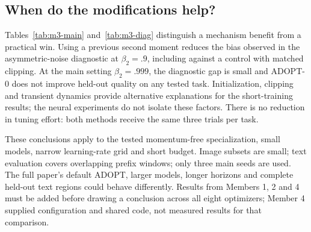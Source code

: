 \subsection{When do the modifications help?}
Tables~\ref{tab:m3-main} and~\ref{tab:m3-diag} distinguish a mechanism benefit from a
practical win. Using a previous second moment reduces the bias observed in the asymmetric-noise
diagnostic at $\beta_2=.9$, including against a control with matched clipping. At the main
setting $\beta_2=.999$, the diagnostic gap is small and ADOPT-0 does not improve held-out
quality on any tested task. Initialization, clipping and transient dynamics provide alternative
explanations for the short-training results; the neural experiments do not isolate these factors.
There is no reduction in tuning effort: both methods receive the same three trials per task.

These conclusions apply to the tested momentum-free specialization, small models, narrow
learning-rate grid and short budget. Image subsets are small; text evaluation covers overlapping
prefix windows; only three main seeds are used. The full paper's default ADOPT, larger models,
longer horizons and complete held-out text regions could behave differently. Results from
Members 1, 2 and 4 must be added before drawing a conclusion across all eight optimizers;
Member 4 supplied configuration and shared code, not measured results for that comparison.
